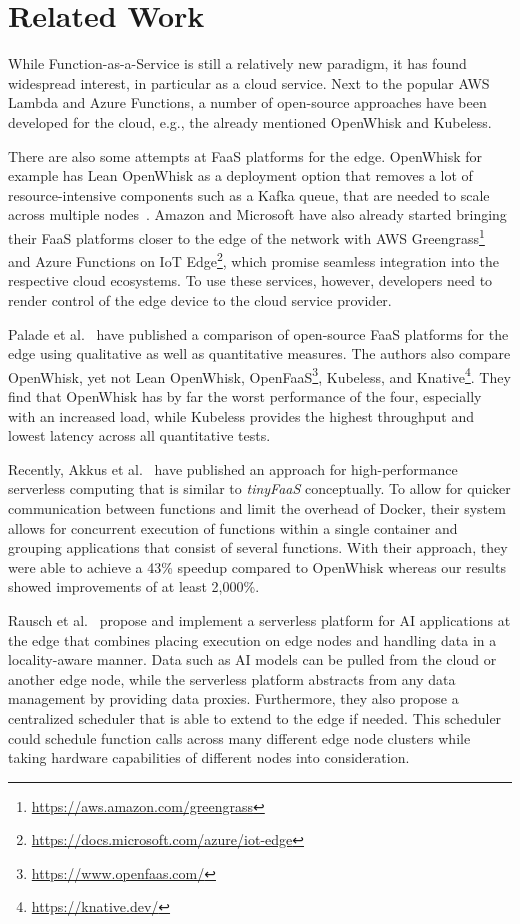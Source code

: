 \section{Related Work}
\label{cha:relatedwork}

While Function-as-a-Service is still a relatively new paradigm, it has found widespread interest, in particular as a cloud service.
Next to the popular AWS Lambda and Azure Functions, a number of open-source approaches have been developed for the cloud, e.g., the already mentioned OpenWhisk and Kubeless.

There are also some attempts at FaaS platforms for the edge.
OpenWhisk for example has Lean OpenWhisk as a deployment option that removes a lot of resource-intensive components such as a Kafka queue, that are needed to scale across multiple nodes~\cite{Breitgand2018-fs}.
Amazon and Microsoft have also already started bringing their FaaS platforms closer to the edge of the network with AWS Greengrass\footnote{\url{https://aws.amazon.com/greengrass}} and Azure Functions on IoT Edge\footnote{\url{https://docs.microsoft.com/azure/iot-edge}}, which promise seamless integration into the respective cloud ecosystems.
To use these services, however, developers need to render control of the edge device to the cloud service provider.

Palade et al.~\cite{Palade2019-mo} have published a comparison of open-source FaaS platforms for the edge using qualitative as well as quantitative measures.
The authors also compare OpenWhisk, yet not Lean OpenWhisk, OpenFaaS\footnote{\url{https://www.openfaas.com/}}, Kubeless, and Knative\footnote{\url{https://knative.dev/}}.
They find that OpenWhisk has by far the worst performance of the four, especially with an increased load, while Kubeless provides the highest throughput and lowest latency across all quantitative tests.

Recently, Akkus et al.~\cite{Akkus2018-gj} have published an approach for high-performance serverless computing that is similar to \textit{tinyFaaS} conceptually.
To allow for quicker communication between functions and limit the overhead of Docker, their system allows for concurrent execution of functions within a single container and grouping applications that consist of several functions.
With their approach, they were able to achieve a 43\% speedup compared to OpenWhisk whereas our results showed improvements of at least 2,000\%.

Rausch et al.~\cite{Rausch2019-eo} propose and implement a serverless platform for AI applications at the edge that combines placing execution on edge nodes and handling data in a locality-aware manner.
Data such as AI models can be pulled from the cloud or another edge node, while the serverless platform abstracts from any data management by providing data proxies.
Furthermore, they also propose a centralized scheduler that is able to extend to the edge if needed.
This scheduler could schedule function calls across many different edge node clusters while taking hardware capabilities of different nodes into consideration.

